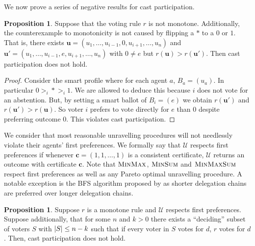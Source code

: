 \documentclass[11pt,a4paper, titlepage]{article}
\DeclarePairedDelimiter\abs{\lvert}{\rvert}
\theoremstyle{definition}
\newtheorem{proposition}[theorem]{Proposition}
\let\vec\mathbf
\begin{document}
We now prove a series of negative results for cast participation.



\begin{proposition} Suppose that the voting rule $r$ is not monotone. Additionally, the counterexample to monotonicity is not caused by flipping a $*$ to a $0$ or $1$. 
That is, there exists $\vec{u} = (u_1, \ldots, u_{i-1}, 0, u_{i+1}, \ldots, u_n)$ and $\vec{u}' = (u_1, \ldots, u_{i-1}, e, u_{i+1}, \ldots, u_n)$ with $0 \neq e$ but $r(\vec{u}) > r(\vec{u}')$. 
Then cast participation does not hold.
\end{proposition}

\begin{proof}
    Consider the smart profile where for each agent $a$, $B_a = (u_a)$. 
    In particular $0 >_i * >_i 1$. We are allowed to deduce this because $i$ does not vote for an abstention.
    But, by setting a smart ballot of $B_i = (e)$ we obtain $r(\vec{u}')$ and $ r(\vec{u}') > r(\vec{u})$. So voter $i$ prefers to vote directly for $e$ than $0$ despite preferring outcome $0$.
    This violates cast participation.
\end{proof}

We consider that most reasonable unravelling procedures will not needlessly violate their agents' first preferences. 
We formally say that $\mathcal{U}$ respects first preferences if whenever $\vec{c} = (1, 1, \ldots, 1)$ is a consistent certificate, $\mathcal{U}$ returns an outcome with certificate $\vec{c}$. 
Note that $\textsc{MinMax}$, $\textsc{MinSum}$ and $\textsc{MinMaxSum}$ respect first preferences as well as any Pareto optimal unravelling procedure. A notable exception is the BFS algorithm proposed by \citeauthor{kotsialou} as shorter delegation chains are preferred over longer delegation chains.

\begin{proposition}
    Suppose $r$ is a monotone rule and $\mathcal{U}$ respects first preferences. Suppose additionally, that for some $n$ and $k > 0$ there exists a ``deciding'' subset of voters $S$ with $\abs{S} \leq n - k$ such that if every voter in $S$ votes for $d$, $r$ votes for $d$.
    Then, cast participation does not hold.
\end{proposition}
\end{document}
